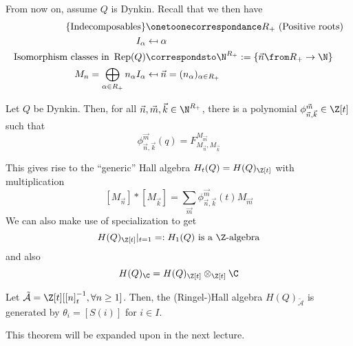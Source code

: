\documentclass[11pt,leqno,oneside]{amsbook}
\numberwithin{thm}{section}
\newcommand{\Rep}{\operatorname{Rep}} %
\renewcommand{\Q}{Q} %
\newcommand\mapsfrom{\mathrel{\reflectbox{\ensuremath{\mapsto}}}}
\newcommand{\roots}{R} %
\newcommand{\A}{\tilde{\mathcal{A}}}
\begin{document}
From now on, assume \(\Q\) is Dynkin. Recall that we then have
\begin{align*}
  \{\text{Indecomposables}\} & \onetoonecorrespondance \roots_+ \text{
                               (Positive roots)} \\
  I_\alpha & \mapsfrom \alpha \\
  \text{Isomorphism classes in } \Rep(\Q) & \correspondsto \N^{\roots_+} :=
                                            \{\vec{n} \from \roots_+ \to
                                            \N\} \\
  M_n = \bigoplus_{\alpha \in \roots_+} n_\alpha I_\alpha
  & \mapsfrom \vec{n} = (n_\alpha)_{\alpha \in \roots_+}
\end{align*}
\begin{prop}
  Let \(\Q\) be Dynkin. Then, for all \(\vec{n}, \vec{m}, \vec{k} \in
  \N^{\roots_+}\), there is a polynomial \(\phi_{\vec{n},\vec{k}}^{\vec{m}}
  \in \Z[t]\) such that \[
    \phi_{\vec{n},\vec{k}}^{\vec{m}}(q) = F_{M_{\vec{n}}, M_{\vec{k}}}^{M_{\vec{m}}}
  \]
\end{prop}
This gives rise to the ``generic'' Hall algebra \(H_t(\Q) =
H(\Q)_{\Z[t]}\) with multiplication \[
  [M_{\vec{n}}] * [M_{\vec{k}}] = \sum_{\vec{m}}
  \phi_{\vec{n},\vec{k}}^{\vec{m}}(t) M_{\vec{m}}
\]
We can also make use of specialization to get \[
  H(\Q)_{\Z[t]}|_{t=1} =: H_1(\Q) \text{ is a }\Z\text{-algebra}
\]
and also \[
  H(\Q)_\C = H(\Q)_{\Z[t]} \otimes_{\Z[t]} \C
\]
\begin{thm}\label{hall-alg-gen-by-thetas}
  Let \(\A = \Z[t][[n]_t^{-1}, \forall n \geq 1]\). Then, the
  (Ringel-)Hall algebra \(H(\Q)_{\A}\) is generated by \(\theta_i =
  [S(i)]\) for \(i \in I\). 
\end{thm}
This theorem will be expanded upon in the next lecture.
\end{document}

